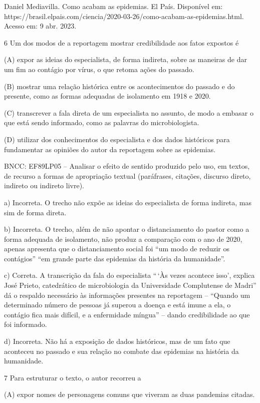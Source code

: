 \begin{itemize}
\begin{itemize}
\begin{escolha}
\begin{escolha}
\begin{escolha}
\begin{escolha}
\begin{escolha}
Daniel Mediavilla. Como acabam as epidemias. El País. Disponível em:
https://brasil.elpais.com/ciencia/2020-03-26/como-acabam-as-epidemias.html.
Acesso em: 9 abr. 2023.

\num{6} Um dos modos de a reportagem mostrar credibilidade aos fatos
expostos é

(A) expor as ideias do especialista, de forma indireta, sobre as
maneiras de dar um fim ao contágio por vírus, o que retoma ações do
passado.

(B) mostrar uma relação histórica entre os acontecimentos do passado e
do presente, como as formas adequadas de isolamento em 1918 e 2020.

(C) transcrever a fala direta de um especialista no assunto, de modo a
embasar o que está sendo informado, como as palavras do microbiologista.

(D) utilizar dos conhecimentos do especialista e dos dados históricos
para fundamentar as opiniões do autor da reportagem sobre as epidemias.

BNCC: EF89LP05 -- Analisar o efeito de sentido produzido pelo uso, em
textos, de recurso a formas de apropriação textual (paráfrases,
citações, discurso direto, indireto ou indireto livre).

a) Incorreta. O trecho não expõe as ideias do especialista de forma
indireta, mas sim de forma direta.

b) Incorreta. O trecho, além de não apontar o distanciamento do pastor
como a forma adequada de isolamento, não produz a comparação com o ano
de 2020, apenas apresenta que o distanciamento social foi ``um modo de
reduzir os contágios'' ``em grande parte das epidemias da história da
humanidade''.

c) Correta. A transcrição da fala do especialista ``\,`Às vezes acontece
isso', explica José Prieto, catedrático de microbiologia da Universidade
Complutense de Madri'' dá o respaldo necessário às informações presentes
na reportagem -- ``Quando um determinado número de pessoas já superou a
doença e está imune a ela, o contágio fica mais difícil, e a enfermidade
míngua'' -- dando credibilidade ao que foi informado.

d) Incorreta. Não há a exposição de dados históricos, mas de um fato que
aconteceu no passado e sua relação no combate das epidemias na história
da humanidade.

\num{7} Para estruturar o texto, o autor recorreu a

(A) expor nomes de personagens comuns que viveram as duas pandemias
citadas.


\end{escolha}
\end{escolha}
\end{escolha}
\end{escolha}
\end{escolha}
\end{itemize}
\end{itemize}

